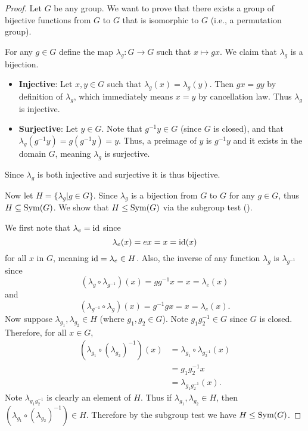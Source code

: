 \begin{proof}
    Let $G$ be any group. We want to prove that there exists a group of bijective functions from $G$ to $G$ that is isomorphic to $G$ (i.e., a permutation group).

    For any $g \in G$ define the map $\lambda_g: G \to G$ such that $x \mapsto gx$. We claim that $\lambda_g$ is a bijection.
    \begin{itemize}
        \item \textbf{Injective}: Let $x, y \in G$ such that $\lambda_g(x) = \lambda_g(y)$. Then $gx = gy$ by definition of $\lambda_g$, which immediately means $x = y$ by cancellation law. Thus $\lambda_g$ is injective.

        \item \textbf{Surjective}: Let $y \in G$. Note that $g^{-1}y \in G$ (since $G$ is closed), and that $\lambda_g(g^{-1}y) = g(g^{-1}y) = y$. Thus, a preimage of $y$ is $g^{-1}y$ and it exists in the domain $G$, meaning $\lambda_g$ is surjective.
    \end{itemize}
    Since $\lambda_g$ is both injective and surjective it is thus bijective.

    Now let $H = \{\lambda_g \vert g \in G\}$. Since $\lambda_g$ is a bijection from $G$ to $G$ for any $g \in G$, thus $H \subseteq \mathrm{Sym}(G)$. We show that $H \leq \mathrm{Sym}(G)$ via the subgroup test ().

    We first note that $\lambda_e = \mathrm{id}$ since
    \[
        \lambda_e(x) = ex = x = \mathrm{id}(x)
    \]
    for all $x$ in $G$, meaning $\mathrm{id} = \lambda_e \in H$. Also, the inverse of any function $\lambda_g$ is $\lambda_{g^{-1}}$ since
    \[
        (\lambda_g \circ \lambda_{g^{-1}})(x) = gg^{-1}x = x = \lambda_e(x)
    \]
    and
    \[
        (\lambda_{g^{-1}} \circ \lambda_g)(x) = g^{-1}gx = x = \lambda_e(x).
    \]
    Now suppose $\lambda_{g_1}, \lambda_{g_2} \in H$ (where $g_1, g_2 \in G$). Note $g_1g_2^{-1} \in G$ since $G$ is closed. Therefore, for all $x \in G$,
    \begin{align*}
        \left(\lambda_{g_1} \circ \left(\lambda_{g_2}\right)^{-1}\right)(x) &= \lambda_{g_1}\circ\lambda_{g_2^{-1}}(x)\\
        &= g_1g_2^{-1}x\\
        &= \lambda_{g_1g_2^{-1}}(x).
    \end{align*}
    Note $\lambda_{g_1g_2^{-1}}$ is clearly an element of $H$. Thus if $\lambda_{g_1}, \lambda_{g_2} \in H$, then $\left(\lambda_{g_1} \circ \left(\lambda_{g_2}\right)^{-1}\right) \in H$. Therefore by the subgroup test we have $H \leq \mathrm{Sym}(G)$.


\end{proof}
